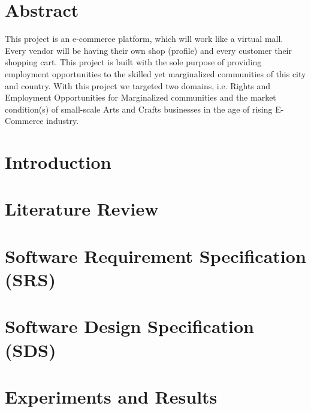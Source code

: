 \documentclass[12pt,twosided]{report}
\begin{document}
\chapter*{Abstract}
This project is an e-commerce platform, which will work like a virtual mall. Every vendor will be having their own shop (profile) and every customer their shopping cart. This project is built with the sole purpose of providing employment opportunities to the skilled yet marginalized communities of this city and country. With this project we targeted two domains, i.e. Rights and Employment Opportunities for Marginalized communities and the market condition(s) of small-scale Arts and Crafts businesses in the age of rising E-Commerce industry.

\tableofcontents
\listoffigures
\listoftables


\chapter{Introduction}
\label{chap:intro}


\chapter{Literature Review}
\label{chap:lit}


\chapter{Software Requirement Specification (SRS)}
\label{chap:srs}


\chapter{Software Design Specification (SDS)}
\label{chap:sds}


\chapter{Experiments and Results}
\label{chap:results}

\end{document}
